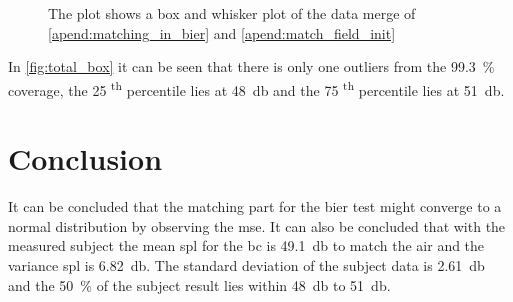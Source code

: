  \begin{figure}[H]
	\centering
	
		\caption{The plot shows a box and whisker plot of the data merge of \autoref{apend:matching_in_bier} and \autoref{apend:match_field_init}}
		\label{fig:total_box}
\end{figure}

In \autoref{fig:total_box} it can be seen that there is only one outliers from the \SI{99.3}{\percent} coverage, the 25 \textsuperscript{th} percentile lies at \SI{48}{\decibel} and the 75 \textsuperscript{th} percentile lies at \SI{51}{\decibel}.


\section{Conclusion}
It can be concluded that the matching part for the \gls{bier} test might converge to a normal distribution by observing the \gls{mse}. It can also be concluded that with the measured subject the mean \gls{spl} for the \gls{bc} is \SI{49.1}{\decibel} to match the air  and the variance \gls{spl} is \SI{6.82}{\decibel}. The standard deviation of the subject data is \SI{2.61}{\decibel} and the \SI{50}{\percent} of the subject result lies within \SI{48}{\decibel} to \SI{51}{\decibel}.





